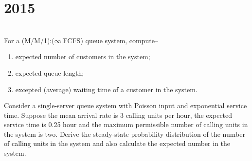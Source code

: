 \section*{2015}
\vspace{-.5cm}
\hrulefill \smallskip\\
 For a (M/M/1):($\infty|$FCFS) queue system, compute--
\begin{enumerate}[itemsep = -1ex,label=(\roman*)]
    \vspace{-1ex}
    \item expected number of customers in the system;
    \item expected queue length;
    \item excepted (average) waiting time of a customer in the system.
\end{enumerate}
 Consider a single-server queue system with Poisson input and exponential service time. Suppose the mean arrival rate is 3 calling units per hour, the expected service time is 0.25 hour and the maximum permissible number of calling units in the system is two. Derive the steady-state probability distribution of the number of calling units in the system and also calculate the expected number in the system.